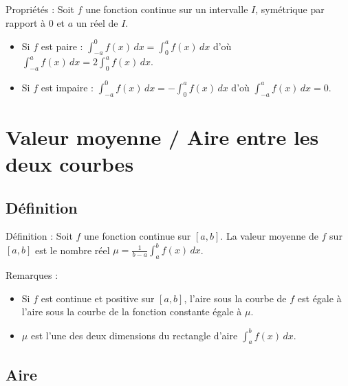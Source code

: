 \documentclass[11pt,a4paper]{article}
\begin{document}
\begin{boiteProp}{Propriétés :}
    Soit $f$ une fonction continue sur un intervalle $I$, symétrique par rapport à $0$ et $a$ un réel de $I$.
    \begin{itemize}
        \item Si $f$ est paire :
        \newline
        $\displaystyle \int_{-a}^0 f(x) \, dx = \int_0^a f(x) \, dx$ d'où $\displaystyle \int_{-a}^a f(x) \, dx = 2 \int_0^a f(x) \, dx$.
        \item Si $f$ est impaire :
        \newline
        $\displaystyle \int_{-a}^0 f(x) \, dx = -\int_0^a f(x) \, dx$ d'où $\displaystyle \int_{-a}^a f(x) \, dx = 0$.       
    \end{itemize} 
\end{boiteProp}

\section{Valeur moyenne / Aire entre les deux courbes}

\subsection{Définition}

\begin{boiteDef}{Définition :}
    Soit $f$ une fonction continue sur $[a,b]$. 
    \newline
    La valeur moyenne de $f$ sur $[a,b]$ est le nombre réel $\mu = \displaystyle \frac{1}{b-a} \int_a^b f(x) \, dx$.
\end{boiteDef}

\begin{boiteRemarque}{Remarques :}
    \begin{itemize}
        \item Si $f$ est continue et positive sur $[a,b]$, l'aire sous la courbe de $f$ est égale à l'aire sous la courbe de la fonction constante égale à $\mu$.
        \item $\mu$ est l'une des deux dimensions du rectangle d'aire $\displaystyle \int_a^b f(x) \, dx$.
    \end{itemize}    
\end{boiteRemarque}

\subsection{Aire}
\end{document}

